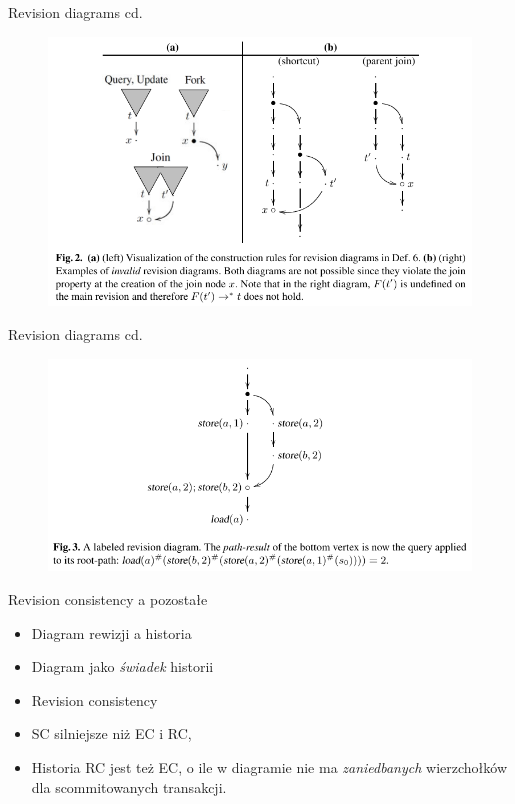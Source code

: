 \documentclass{beamer}
\begin{document}
\begin{frame}{Revision diagrams cd.}
	\begin{figure}
		\centering
		\includegraphics[width=\textwidth]{revdiag2.pdf}
	\end{figure}
\end{frame}

\begin{frame}{Revision diagrams cd.}
	\begin{figure}
		\centering
		\includegraphics[width=\textwidth]{revdiag3.pdf}
	\end{figure}
\end{frame}

\begin{frame}{Revision consistency a pozostałe}
	\begin{card}
		\begin{itemize}[<+->]
			\item Diagram rewizji a historia
			\item Diagram jako \emph{świadek} historii
			\item Revision consistency
		\end{itemize}
	\end{card}
	 {
		\begin{card}
			\begin{itemize}[<+->]
				\item SC silniejsze niż EC i RC,
				\item Historia RC jest też EC, o ile w diagramie nie ma \emph{zaniedbanych} wierzchołków dla scommitowanych transakcji.
			\end{itemize}
		\end{card}
	}
\end{frame}
\end{document}
